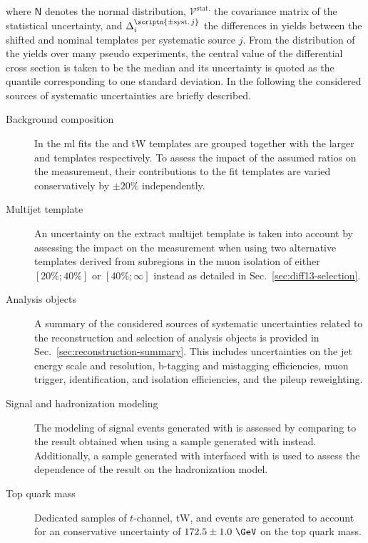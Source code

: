 where $\mathsf{N}$ denotes the normal distribution, $\mathcal{V}^\mathrm{stat.}$ the covariance matrix of the statistical uncertainty, and $\Delta^\scriptn{\mathrm{\pm syst.\,}j}_{i}$ the differences in yields between the shifted and nominal templates per systematic source $j$. From the distribution of the yields over many pseudo experiments, the central value of the differential cross section is taken to be the median and its uncertainty is quoted as the quantile corresponding to one standard deviation. In the following the considered sources of systematic uncertainties are briefly described.

\begin{description}
\item[Background composition] In the \gls{ml} fits the \zjets and tW templates are grouped together with the larger \wjets and \ttbar templates respectively. To assess the impact of the assumed ratios on the measurement, their contributions to the fit templates are varied conservatively by $\pm20\%$ independently.
 
\item[Multijet template] An uncertainty on the extract multijet template is taken into account by assessing the impact on the measurement when using two alternative templates derived from subregions in the muon isolation of either $[20\%; 40\%]$ or $[40\%; \infty]$ instead as detailed in Sec.~\ref{sec:diff13-selection}.

\item[Analysis objects] A summary of the considered sources of systematic uncertainties related to the reconstruction and selection of analysis objects is provided in Sec.~\ref{sec:reconstruction-summary}. This includes uncertainties on the jet energy scale and resolution, b-tagging and mistagging efficiencies, muon trigger, identification, and isolation efficiencies, and the pileup reweighting.

\item[Signal and hadronization modeling] The modeling of signal events generated with \MGAMC is assessed by comparing to the result obtained when using a sample generated with \POWHEG instead. Additionally, a sample generated with \MGAMC interfaced with \HERWIG is used to assess the dependence of the result on the hadronization model.

\item[Top quark mass] Dedicated samples of $t$-channel, tW, and \ttbar events are generated to account for an conservative uncertainty of $172.5\pm1.0~\GeV$ on the top quark mass.


\end{description}
